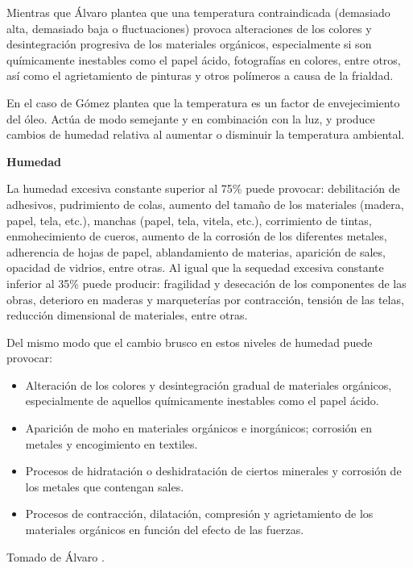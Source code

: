     Mientras que Álvaro \cite{recioalvaroConservacionPreventivaExposiciones2020} plantea que una temperatura contraindicada (demasiado alta, demasiado baja o fluctuaciones) provoca alteraciones de los colores y desintegración progresiva de los materiales orgánicos, especialmente si son químicamente inestables como el papel ácido, fotografías en colores, entre otros, así como el agrietamiento de pinturas y otros polímeros a causa de la frialdad.

    En el caso de Gómez \cite{gomezcarreteroEfectosAcidoNitrico2015a} plantea que la temperatura es un factor de envejecimiento del óleo. Actúa de modo semejante y en combinación con la luz, y produce cambios de humedad relativa al aumentar o disminuir la temperatura ambiental.

    \textbf{Humedad}

    La humedad excesiva constante superior al 75\% puede provocar: debilitación de adhesivos, pudrimiento de colas, aumento del tamaño de los materiales (madera, papel, tela, etc.), manchas (papel, tela, vitela, etc.), corrimiento de tintas, enmohecimiento de cueros, aumento de la corrosión de los diferentes metales, adherencia de hojas de papel, ablandamiento de materias, aparición de sales, opacidad de vidrios, entre otras. Al igual que la sequedad excesiva constante inferior al 35\% puede producir: fragilidad y desecación de los componentes de las obras, deterioro en maderas y marqueterías por contracción, tensión de las telas, reducción dimensional de materiales, entre otras.\cite{marquezAgentesDeterioroMedioambientales2016}

    \newpage

    Del mismo modo que el cambio brusco en estos niveles de humedad puede provocar:
    \begin{itemize}
        \item Alteración de los colores y desintegración gradual de materiales orgánicos, especialmente de aquellos químicamente inestables como el papel ácido.
        \item Aparición de moho en materiales orgánicos e inorgánicos; corrosión en metales y encogimiento en textiles.
        \item Procesos de hidratación o deshidratación de ciertos minerales y corrosión de los metales que contengan sales.
        \item Procesos de contracción, dilatación, compresión y agrietamiento de los materiales orgánicos en función del efecto de las fuerzas.
    \end{itemize}
    Tomado de Álvaro \cite{recioalvaroConservacionPreventivaExposiciones2020}.\vspace{0.5cm}

